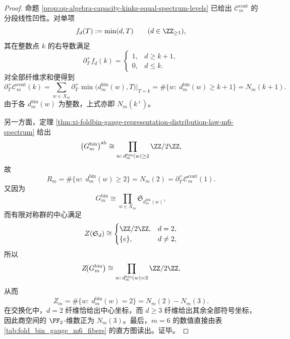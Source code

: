 \begin{proof}
命题 \ref{prop:op-algebra-capacity-kinks-equal-spectrum-levels} 已给出 \(\mathcal C_m^{\mathrm{cont}}\) 的分段线性凹性。对单项
\[
f_d(T):=\min(d,T)
\qquad(d\in \ZZ_{\ge 1}),
\]
其在整数点 \(k\) 的右导数满足
\[
\partial_T^{+}f_d(k)=
\begin{cases}
1,& d\ge k+1,\\
0,& d\le k.
\end{cases}
\]
对全部纤维求和便得到
\[
\partial_T^{+}\mathcal C_m^{\mathrm{cont}}(k)
=
\sum_{w\in X_m}\partial_T^{+}\min\bigl(d_m^{\mathrm{bin}}(w),T\bigr)\big|_{T=k}
=
\#\{w:\ d_m^{\mathrm{bin}}(w)\ge k+1\}
=
N_m(k+1).
\]
由于各 \(d_m^{\mathrm{bin}}(w)\) 为整数，上式亦即 \(N_m(k^+)\)。
\par
另一方面，定理 \ref{thm:xi-foldbin-gauge-representation-distribution-law-m6-spectrum} 给出
\[
\bigl(G_m^{\mathrm{bin}}\bigr)^{\mathrm{ab}}
\cong
\prod_{w:\,d_m^{\mathrm{bin}}(w)\ge 2}\ZZ/2\ZZ,
\]
故
\[
R_m=\#\{w:\ d_m^{\mathrm{bin}}(w)\ge 2\}=N_m(2)=\partial_T^{+}\mathcal C_m^{\mathrm{cont}}(1).
\]
又因为
\[
G_m^{\mathrm{bin}}
\cong
\prod_{w\in X_m}\mathfrak S_{d_m^{\mathrm{bin}}(w)},
\]
而有限对称群的中心满足
\[
Z(\mathfrak S_d)\cong
\begin{cases}
\ZZ/2\ZZ,& d=2,\\
\{e\},& d\neq 2,
\end{cases}
\]
所以
\[
Z\!\bigl(G_m^{\mathrm{bin}}\bigr)
\cong
\prod_{w:\,d_m^{\mathrm{bin}}(w)=2}\ZZ/2\ZZ,
\]
从而
\[
Z_m=\#\{w:\ d_m^{\mathrm{bin}}(w)=2\}=N_m(2)-N_m(3).
\]
在交换化中，\(d=2\) 纤维恰给出中心坐标，而 \(d\ge 3\) 纤维给出其余全部符号坐标，因此商空间的 \(\FF_2\)-维数正为 \(N_m(3)\)。最后，\(m=6\) 的数值直接由表 \ref{tab:fold_bin_gauge_m6_fibers} 的直方图读出。证毕。
\end{proof}

